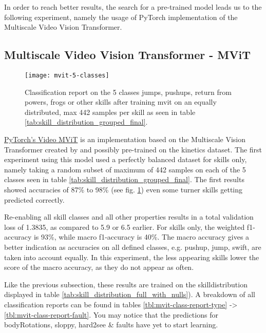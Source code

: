 In order to reach better results, the search for a pre-trained model leads us to the following experiment, namely the usage of PyTorch implementation of the Multiscale Video Vision Transformer.

\subsection{Multiscale Video Vision Transformer - MViT}


\begin{figure}
    \centering
    \texttt{[image: mvit-5-classes]}
    \caption[Classification report on only 5 skill classes]{Classification report on the 5 classes jumps, pushups, return from powers, frogs or other skills after training mvit on an equally distributed, max 442 samples per skill as seen in table \ref{tab:skill_distribution_grouped_final}.}
    \label{fig:mvit-5-classes}
\end{figure}


\href{https://pytorch.org/vision/main/models/video_mvit.html}{PyTorch's Video MViT} is an implementation based on the Multiscale Vision Transformer created by \textcite{Fan2021} and possibly pre-trained on the kinetics dataset.
The first experiment using this model used a perfectly balanced dataset for skills only, namely taking a random subset of maximum of 442 samples on each of the 5 classes seen in table \ref{tab:skill_distribution_grouped_final}.
The first results showed accuracies of 87\% to 98\% (see fig. \ref{fig:mvit-5-classes}) even some turner skills getting predicted correctly.

Re-enabling all skill classes and all other properties results in a total validation loss of 1.3835, as compared to 5.9 or 6.5 earlier.
For skills only, the weighted f1-accuracy is 93\%, while macro f1-accuracy is 40\%.
The macro accuracy gives a better indication as accuracies on all defined classes, e.g. pushup, jump, swift, are taken into account equally. In this experiment, the less appearing skills lower the score of the macro accuracy, as they do not appear as often.

Like the previous subsection, these results are trained on the skilldistribution displayed in table \ref{tab:skill_distribution_full_with_nulls}).
A breakdown of all classification reports can be found in tables \ref{tbl:mvit-class-report-type} -> \ref{tbl:mvit-class-report-fault}. You may notice that the predictions for bodyRotations, sloppy, hard2see \& faults have yet to start learning.

